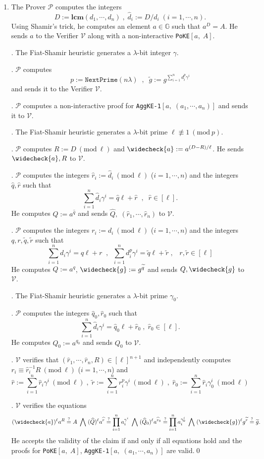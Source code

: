 \documentclass[11pt, lettersize, notitlepage, leqno, footskip=0.6cm]{article}
\newcommand{\pl}{\prod\limits}
\newcommand{\slim}{\sum\limits}
\newcommand{\ttt}{\texttt}
\newcommand{\wti}{\widetilde}
\newcommand{\mc}{\mathcal}
\newcommand{\mb}{\mathbb}
\newcommand{\mbf}{\mathbf}
\newcommand{\lam}{\lambda}
\newcommand{\what}{\widehat}
\newcommand{\weck}{\widecheck}
\newcommand{\vs}{\vspace{-0.15cm}}
\newcommand{\noin}{\noindent}
\newcommand{\sta}{\stackrel{?}{=}}
\newcommand{\Mod}[1]{\ (\mathrm{mod}\ #1)}
\newcommand{\LCM}{\mbf{lcm}}
\numberwithin{equation}{section}
\begin{document}
\begin{enumerate}[wide, labelwidth=!, labelindent=0pt]\vs \item The Prover $\mc{P}$ computes the integers \vs $$D:= \LCM(d_1,\cdots,d_n)\;,\;\what{d}_i:= D/d_i\;(i=1,\cdots,n).$$ Using Shamir's trick, he computes an element $a\in\mb{G}$ such that $a^D = A$. He sends $a$ to the Verifier $\mc{V}$ along with a non-interactive \verb|PoKE|$[a,\;A]$.

\noin 2. The Fiat-Shamir heuristic generates a $\lam$-bit integer $\gamma$.

\noin 3. $\mc{P}$ computes $$p:= \ttt{NextPrime}(n\lam)\;\;,\;\;\wti{g} := g^{\slim_{i=1}^n d_i^{p}\gamma^i}$$ and sends it to the Verifier $\mc{V}$. 

\noin 4. $\mc{P}$ computes a non-interactive proof for \verb|AggKE-1|$[a,\;(a_1,\cdots,a_n)]$ and sends it to $\mc{V}$.

\noin 5. The Fiat-Shamir heuristic generates a $\lam$-bit prime $\ell\not\equiv 1\Mod{p}$.

\noin 6. $\mc{P}$ computes $R:= D\Mod{\ell}$ and $\weck{a}:= a^{(D-R)/\ell}$. He sends $\weck{a}, R$ to $\mc{V}$.

\noin 7. $\mc{P}$ computes the integers $\what{r}_i:= \what{d}_i\Mod{\ell}$ ($i=1,\cdots,n$) and the integers $\what{q},\what{r}$ such that \vs $$\slim_{i=1}^n \what{d}_i\gamma^i = \what{q} \ell + \what{r}\;\;,\;\;\what{r}\in [\ell].$$ He computes $\what{Q}:= a^{\what{q}}$ and sends $\what{Q},\; (\what{r}_1,\cdots,\what{r}_n)$ to $\mc{V}$.

\noin 8. $\mc{P}$ computes the integers ${r}_i:= {d}_i\Mod{\ell}$ ($i=1,\cdots,n$) and the integers $q,r,\wti{q},\wti{r}$ such that \vs $$\slim_{i=1}^n d_i\gamma^i = q\ell+r\;\;,\;\;\slim_{i=1}^n {d}_i^{p}\gamma^i = \wti{q}\ell+\wti{r}\;,\;\;\;r,\wti{r}\in[\ell] $$ He computes ${Q}:= a^q$, $\weck{g}:= g^{\wti{q}}$ and sends ${Q}, \weck{g}$ to $\mc{V}$.

\noin 9. The Fiat-Shamir heuristic generates a $\lam$-bit prime $\gamma_0$.

\noin 10. $\mc{P}$ computes the integers $\what{q}_0,\what{r}_0$ such that \vs $$\slim_{i=1}^n \what{d}_i\gamma^i = \what{q}_0\ell+\what{r}_0\;,\;\what{r}_0\in[\ell].$$ He computes $\what{Q}_0:= a^{q_0}$ and sends ${Q}_0$ to $\mc{V}$.

\noin 11. $\mc{V}$ verifies that $(\what{r}_1,\cdots,\what{r}_n, R)\in [\ell]^{n+1}$ and independently computes $r_i\equiv \what{r}_i^{-1}R\Mod{\ell}$ ($i=1,\cdots,n$) and \vs $$\what{r}:= \slim_{i=1}^n \what{r}_i\gamma^i\Mod{\ell}\;,\;\wti{r}:= {\slim_{i=1}^n r_i^{p}\gamma^i}\Mod{\ell}\;,\; \what{r}_0:= \slim_{i=1}^n \what{r}_i\gamma_0^i\Mod{\ell}$$

\noin 12. $\mc{V}$ verifies the equations \vs $$(\weck{a})^{\ell}a^R\sta A  \;\bigwedge\; (\what{Q})^{\ell} a^{\what{r}}\sta \pl_{i=1}^{n} a_i^{\gamma^i}\;\bigwedge\;(\what{Q}_0)^{\ell}a^{\what{r}_0}\sta \pl_{i=1}^{n} a_i^{\gamma_0^i} \;\bigwedge\; (\weck{g})^{\ell}g^{\wti{r}} \sta \wti{g}.$$ He accepts the validity of the claim if and only if all equations hold and the proofs for \verb|PoKE|$[a,\;A]$, \verb|AggKE-1|$[a,\;(a_1,\cdots,a_n)]$ are valid.\qed \end{enumerate}
\end{document}
